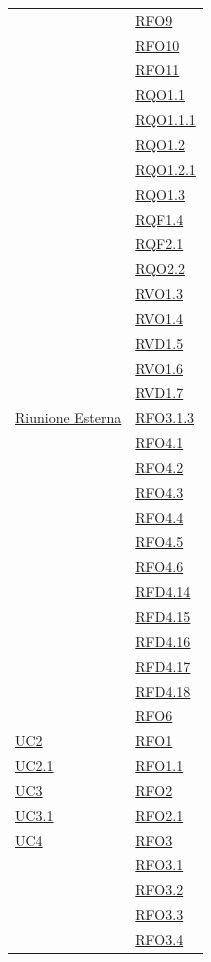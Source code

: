 \begin{longtable}{|>{\centering}m{5cm}|m{5cm}<{\centering}|}
& \hyperlink{RFO9}{RFO9}\\
& \hyperlink{RFO10}{RFO10}\\
& \hyperlink{RFO11}{RFO11}\\
& \hyperlink{RQO1.1}{RQO1.1}\\
& \hyperlink{RQO1.1.1}{RQO1.1.1}\\
& \hyperlink{RQO1.2}{RQO1.2}\\
& \hyperlink{RQO1.2.1}{RQO1.2.1}\\
& \hyperlink{RQO1.3}{RQO1.3}\\
& \hyperlink{RQF1.4}{RQF1.4}\\
& \hyperlink{RQF2.1}{RQF2.1}\\
& \hyperlink{RQO2.2}{RQO2.2}\\
& \hyperlink{RVO1.3}{RVO1.3}\\
& \hyperlink{RVO1.4}{RVO1.4}\\
& \hyperlink{RVD1.5}{RVD1.5}\\
& \hyperlink{RVO1.6}{RVO1.6}\\
& \hyperlink{RVD1.7}{RVD1.7}\\ \hline
\hyperlink{Riunione Esterna}{Riunione Esterna} & \hyperlink{RFO3.1.3}{RFO3.1.3}\\
& \hyperlink{RFO4.1}{RFO4.1}\\
& \hyperlink{RFO4.2}{RFO4.2}\\
& \hyperlink{RFO4.3}{RFO4.3}\\
& \hyperlink{RFO4.4}{RFO4.4}\\
& \hyperlink{RFO4.5}{RFO4.5}\\
& \hyperlink{RFO4.6}{RFO4.6}\\

& \hyperlink{RFD4.14}{RFD4.14}\\
& \hyperlink{RFD4.15}{RFD4.15}\\
& \hyperlink{RFD4.16}{RFD4.16}\\
& \hyperlink{RFD4.17}{RFD4.17}\\
& \hyperlink{RFD4.18}{RFD4.18}\\
& \hyperlink{RFO6}{RFO6}\\ \hline
\hyperref[UC2]{UC2} & \hyperlink{RFO1}{RFO1}\\ \hline
\hyperref[UC2.1]{UC2.1} & \hyperlink{RFO1.1}{RFO1.1}\\ \hline
\hyperref[UC3]{UC3} & \hyperlink{RFO2}{RFO2}\\ \hline
\hyperref[UC3.1]{UC3.1} & \hyperlink{RFO2.1}{RFO2.1}\\ \hline
\hyperref[UC4]{UC4} & \hyperlink{RFO3}{RFO3}\\
& \hyperlink{RFO3.1}{RFO3.1}\\
& \hyperlink{RFO3.2}{RFO3.2}\\
& \hyperlink{RFO3.3}{RFO3.3}\\
& \hyperlink{RFO3.4}{RFO3.4}\\


\end{longtable}
